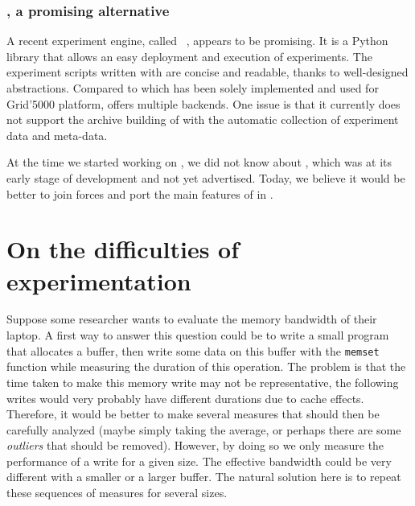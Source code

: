         \subsection{\enoslib, a promising alternative}%
        \label{sub:enoslib}

            A recent experiment engine, called \enoslib~\cite{enoslib}, appears to be promising. It is a Python library
            that allows an easy deployment and execution of experiments. The experiment scripts written with \enoslib
            are concise and readable, thanks to well-designed abstractions. Compared to \peanut which has been solely
            implemented and used for Grid'5000 platform, \enoslib offers multiple backends.  One issue is that it
            currently does not support the archive building of \peanut with the automatic collection of experiment data
            and meta-data.

            At the time we started working on \peanut, we did not know about \enoslib, which was at its early stage of
            development and not yet advertised. Today, we believe it would be better to join forces and port the main
            features of \peanut in \enoslib.

\chapter{On the difficulties of experimentation}%
\label{chapter:experiment:difficulties}
    Suppose some researcher wants to evaluate the memory bandwidth of their laptop. A first way to answer this question
    could be to write a small program that allocates a buffer, then write some data on this buffer with the
    \texttt{memset} function while measuring the duration of this operation. The problem is that the time taken to make
    this memory write may not be representative, the following writes would very probably have different durations due
    to cache effects.  Therefore, it would be better to make several measures that should then be carefully analyzed
    (maybe simply taking the average, or perhaps there are some \emph{outliers} that should be removed). However, by
    doing so we only measure the performance of a write for a given size. The effective bandwidth could be very
    different with a smaller or a larger buffer. The natural solution here is to repeat these sequences of measures for
    several sizes.


